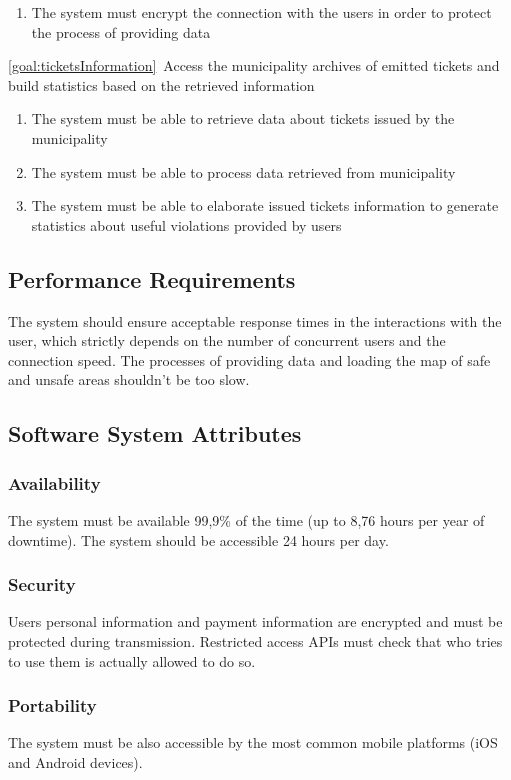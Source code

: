 \begin{description}
\begin{enumerate}[resume*]
   				\item The system must encrypt the connection with the users in order to protect the process of providing data
  			\end{enumerate}
  		\item \ref{goal:ticketsInformation}\ Access the municipality archives of emitted tickets and build statistics based on the retrieved information
  			\begin{enumerate}[resume*] 
  				\item The system must be able to retrieve data about tickets issued by the municipality 
   				\item The system must be able to process data retrieved from municipality
   				\item The system must be able to elaborate issued tickets information to generate statistics about useful violations provided by users
   			\end{enumerate}
   	\end{description}
  	
\subsection{Performance Requirements}
	The system should ensure acceptable response times in the interactions with the user, which strictly depends on the number of concurrent users and the connection speed.
\newline
The processes of providing data and loading the map of safe and unsafe areas shouldn't be too slow.
\subsection{Software System Attributes}
	\subsubsection{Availability}
	The system must be available 99,9\% of the time (up to 8,76 hours per year of downtime). The system should be accessible 24 hours per day.
	\subsubsection{Security}
	Users personal information and payment information are encrypted and must be protected during transmission.
	Restricted access APIs must check that who tries to use them is actually allowed to do so.
	\subsubsection{Portability}
	The system must be also accessible by the most common mobile platforms (iOS and Android devices).

